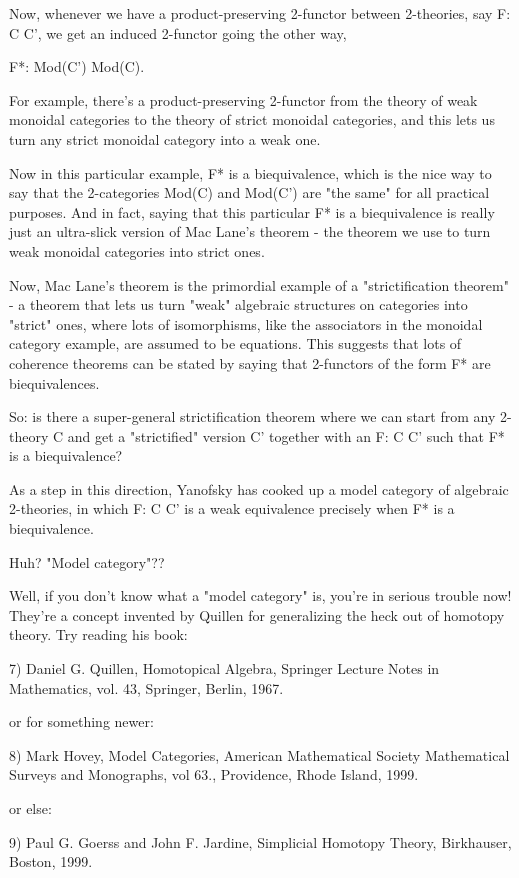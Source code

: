 Now, whenever we have a product-preserving 2-functor between 2-theories, 
say F: C \to  C', we get an induced 2-functor going the other way,

F*: Mod(C') \to  Mod(C).

For example, there's a product-preserving 2-functor from the theory of 
weak monoidal categories to the theory of strict monoidal categories, 
and this lets us turn any strict monoidal category into a weak one.  

Now in this particular example, F* is a biequivalence, which is the nice 
way to say that the 2-categories Mod(C) and Mod(C') are "the same" for all 
practical purposes.  And in fact, saying that this particular F* is a 
biequivalence is really just an ultra-slick version of Mac Lane's theorem - 
the theorem we use to turn weak monoidal categories into strict ones.  

Now, Mac Lane's theorem is the primordial example of a "strictification
theorem" - a theorem that lets us turn "weak" algebraic structures on 
categories into "strict" ones, where lots of isomorphisms, like the 
associators in the monoidal category example, are assumed to be equations.  
This suggests that lots of coherence theorems can be stated by saying that 
2-functors of the form F* are biequivalences.  

So: is there a super-general strictification theorem where we can start
from any 2-theory C and get a "strictified" version C' together with an
F: C \to  C' such that F* is a biequivalence?

As a step in this direction, Yanofsky has cooked up a model category of 
algebraic 2-theories, in which F: C \to  C' is a weak equivalence precisely
when F* is a biequivalence.  

Huh?  "Model category"?? 

Well, if you don't know what a "model category" is, you're in serious 
trouble now!  They're a concept invented by Quillen for generalizing
the heck out of homotopy theory.  Try reading his book:

7) Daniel G. Quillen, Homotopical Algebra, Springer Lecture Notes in 
Mathematics, vol. 43, Springer, Berlin, 1967.

or for something newer:

8) Mark Hovey, Model Categories, American Mathematical Society Mathematical 
Surveys and Monographs, vol 63., Providence, Rhode Island, 1999.

or else:

9) Paul G. Goerss and John F. Jardine, Simplicial Homotopy Theory, 
Birkhauser, Boston, 1999.

